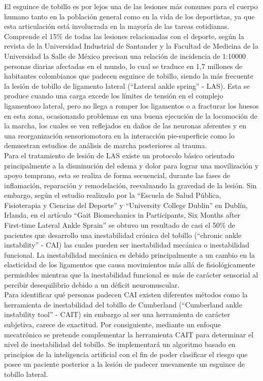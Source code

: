 El esguince de tobillo es por lejos una de las lesiones más comunes para el cuerpo humano tanto en la población general como en la vida de los deportistas, ya que esta articulación está involucrada en la mayoría de las tareas cotidianas. Comprende el 15\% de todas las lesiones relacionadas con el deporte, según la revista de la Universidad Industrial de Santander y la Facultad de Medicina de la Universidad la Salle de México \citep{catalan2018tratamiento} precisan una relación de incidencia de 1:10000 personas diarias afectadas en el mundo, lo cual se traduce en 1,7 millones de habitantes colombianos que padecen esguince de tobillo, siendo la más frecuente la lesión de tobillo de ligamento lateral (“Lateral ankle spring” - LAS). Esta se produce cuando una carga excede los límites de tensión en el complejo ligamentoso lateral, pero no llega a romper los ligamentos o a fracturar los huesos en esta zona, ocasionando problemas en una buena ejecución de la locomoción de la marcha, los cuales se ven reflejados en daños de las neuronas aferentes y en una reorganización sensoriomotora en la interacción pie-superficie como lo demuestran estudios de análisis de marcha posteriores al trauma.\\ 
Para el tratamiento de lesión de LAS existe un protocolo básico orientado principalmente a la disminución del edema y dolor para lograr una movilización y apoyo temprano, esta se realiza de forma secuencial, durante las fases de inflamación, reparación y remodelación, reevaluando la gravedad de la lesión. Sin embargo, según el estudio realizado por la “Escuela de Salud Pública, Fisioterapia y Ciencias del Deporte” y “University College Dublin” en Dublín, Irlanda, en el artículo “Gait Biomechanics in Participants, Six Months after First-time Lateral Ankle Sprain” se obtuvo un resultado de casi el 50\% de pacientes que desarrollo una inestabilidad crónica del tobillo (“chronic ankle instability” - CAI) las cuales pueden ser inestabilidad mecánica o inestabilidad funcional. La inestabilidad mecánica es debido principalmente a un cambio en la elasticidad de los ligamentos que causa movimientos más allá de fisiológicamente permisibles mientras que la inestabilidad funcional es más de carácter sensorial al percibir desequilibrio debido a un déficit neuromuscular.\\

Para identificar qué personas padecen CAI existen diferentes métodos como la herramienta de inestabilidad del tobillo de Cumberland (“Cumberland ankle instability tool” - CAIT) sin embargo al ser una herramienta de carácter subjetiva, carece de exactitud. Por consiguiente, mediante un enfoque mecatrónico se pretende complementar la herramienta CAIT para determinar el nivel de inestabilidad del tobillo. Se implementará un algoritmo basado en principios de la inteligencia artificial con el fin de poder clasificar el riesgo que posee un paciente posterior a la lesión de padecer nuevamente un esguince de tobillo lateral. 

